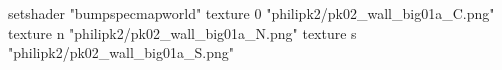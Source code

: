 setshader "bumpspecmapworld"
    texture 0 "philipk2/pk02_wall_big01a_C.png"
    texture n "philipk2/pk02_wall_big01a_N.png"
    texture s "philipk2/pk02_wall_big01a_S.png"